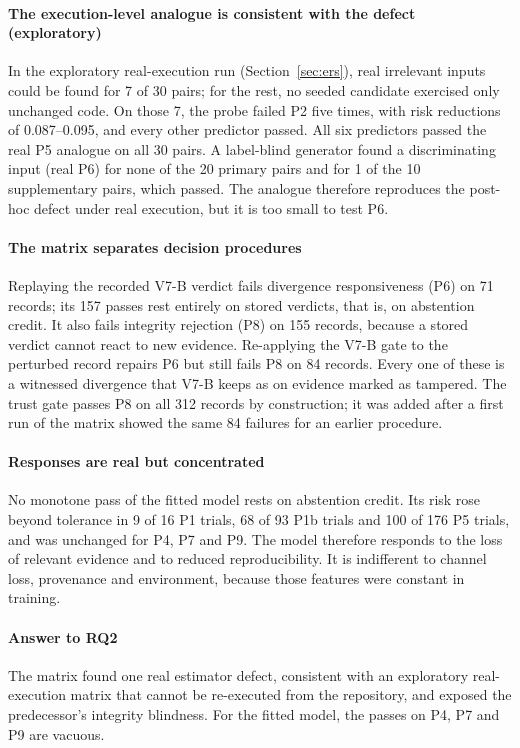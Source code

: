 \paragraph*{The execution-level analogue is consistent with the defect (exploratory)} In the exploratory real-execution run (Section~\ref{sec:ers}), real irrelevant inputs could be found for 7 of 30 pairs; for the rest, no seeded candidate exercised only unchanged code. On those 7, the probe failed P2 five times, with risk reductions of 0.087--0.095, and every other predictor passed. All six predictors passed the real P5 analogue on all 30 pairs. A label-blind generator found a discriminating input (real P6) for none of the 20 primary pairs and for 1 of the 10 supplementary pairs, which passed. The analogue therefore reproduces the post-hoc defect under real execution, but it is too small to test P6.

\paragraph*{The matrix separates decision procedures} Replaying the recorded V7-B verdict fails divergence responsiveness (P6) on 71 records; its 157 passes rest entirely on stored \INS{} verdicts, that is, on abstention credit. It also fails integrity rejection (P8) on 155 records, because a stored verdict cannot react to new evidence. Re-applying the V7-B gate to the perturbed record repairs P6 but still fails P8 on 84 records. Every one of these is a witnessed divergence that V7-B keeps as \DIV{} on evidence marked as tampered. The \sbg{} trust gate passes P8 on all 312 records by construction; it was added after a first run of the matrix showed the same 84 failures for an earlier \sbg{} procedure.

\paragraph*{Responses are real but concentrated} No monotone pass of the fitted model rests on abstention credit. Its risk rose beyond tolerance in 9 of 16 P1 trials, 68 of 93 P1b trials and 100 of 176 P5 trials, and was unchanged for P4, P7 and P9. The model therefore responds to the loss of relevant evidence and to reduced reproducibility. It is indifferent to channel loss, provenance and environment, because those features were constant in training.

\paragraph*{Answer to RQ2} The matrix found one real estimator defect, consistent with an exploratory real-execution matrix that cannot be re-executed from the repository, and exposed the predecessor's integrity blindness. For the fitted model, the passes on P4, P7 and P9 are vacuous.

